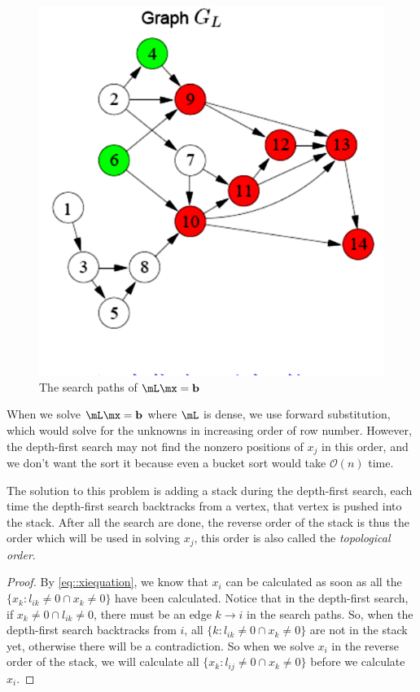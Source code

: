 \begin{exm}
\begin{figure}[H]
        \hfill
        \includegraphics[width=0.49\linewidth]{png/GL2.png}
        \caption{The search paths of $\mL\mx=\mathbf{b}$}
        \label{fig::LGL2}
    \end{figure}
\end{exm}

\begin{lem}
    \label{lem::toporder}
    When we solve $\mL\mx=\mathbf{b}$ where $\mL$ is dense, we 
    use forward substitution, which would solve for the 
    unknowns in increasing order of row number. However, the 
    depth-first search may not find the nonzero positions of 
    $x_j$ in this order, and we don't want the sort it because 
    even a bucket sort would take $\mathcal{O}(n)$ time. 

    The solution to this problem is adding a stack during the 
    depth-first search, each time the depth-first search 
    backtracks from a vertex, that vertex is pushed into the 
    stack. After all the search are done, the reverse order 
    of the stack is thus the order which will be used in 
    solving $x_j$, this order is also called the \textit{
    topological order}.
\end{lem}
\begin{proof}
    By \eqref{eq::xiequation}, we know that $x_i$ can be 
    calculated as soon as all the $\{x_k:l_{ik}\neq 0\cap 
    x_k\neq 0\}$ have been calculated. Notice that in the 
    depth-first search, if $x_k\neq 0\cap l_{ik}\neq 0$, 
    there must be an edge $k\rightarrow i$ in the search paths. 
    So, when the depth-first search backtracks from $i$, all 
    $\{k:l_{ik}\neq 0\cap x_k\neq 0\}$ are not in the stack 
    yet, otherwise there will be a contradiction. So when we 
    solve $x_i$ in the reverse order of the stack, we will 
    calculate all $\{x_k:l_{ij}\neq 0\cap x_k\neq 0\}$ before 
    we calculate $x_i$.
\end{proof}

